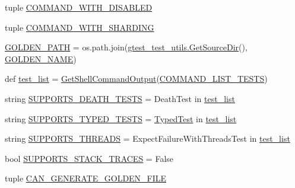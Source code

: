 \begin{DoxyCompactItemize}
tuple \hyperlink{namespacegtest__output__test_a0ef963a39dc8e53616ba2dab9f128def}{C\+O\+M\+M\+A\+N\+D\+\_\+\+W\+I\+T\+H\+\_\+\+D\+I\+S\+A\+B\+L\+ED}
\item 
tuple \hyperlink{namespacegtest__output__test_a462eef2a00782001d491b7a38a847bec}{C\+O\+M\+M\+A\+N\+D\+\_\+\+W\+I\+T\+H\+\_\+\+S\+H\+A\+R\+D\+I\+NG}
\item 
\hyperlink{namespacegtest__output__test_aa592d897eeba0ac7e1a3c7d84f182c11}{G\+O\+L\+D\+E\+N\+\_\+\+P\+A\+TH} = os.\+path.\+join(\hyperlink{namespacegtest__test__utils_aaff66cb0980804d8bd57dc719d4b5518}{gtest\+\_\+test\+\_\+utils.\+Get\+Source\+Dir}(), \hyperlink{namespacegtest__output__test_a317ece7d11d9103a7bdbf0320b64a981}{G\+O\+L\+D\+E\+N\+\_\+\+N\+A\+ME})
\item 
def \hyperlink{namespacegtest__output__test_a1e17eb07fcc42eefeed11a5f87b2d3ae}{test\+\_\+list} = \hyperlink{namespacegtest__output__test_a0dbdd37611259249a58ab13ed60d8172}{Get\+Shell\+Command\+Output}(\hyperlink{namespacegtest__output__test_ad57de209fb07e1002c8a929dd8a15dc9}{C\+O\+M\+M\+A\+N\+D\+\_\+\+L\+I\+S\+T\+\_\+\+T\+E\+S\+TS})
\item 
string \hyperlink{namespacegtest__output__test_a401e837dae10d6c728bd74684884a77f}{S\+U\+P\+P\+O\+R\+T\+S\+\_\+\+D\+E\+A\+T\+H\+\_\+\+T\+E\+S\+TS} = \textquotesingle{}Death\+Test\textquotesingle{} in \hyperlink{namespacegtest__output__test_a1e17eb07fcc42eefeed11a5f87b2d3ae}{test\+\_\+list}
\item 
string \hyperlink{namespacegtest__output__test_aa762abdf62ac6efe1aa2405b3f506380}{S\+U\+P\+P\+O\+R\+T\+S\+\_\+\+T\+Y\+P\+E\+D\+\_\+\+T\+E\+S\+TS} = \textquotesingle{}\hyperlink{class_typed_test}{Typed\+Test}\textquotesingle{} in \hyperlink{namespacegtest__output__test_a1e17eb07fcc42eefeed11a5f87b2d3ae}{test\+\_\+list}
\item 
string \hyperlink{namespacegtest__output__test_a9c611ee196914defbb5d32a47c606640}{S\+U\+P\+P\+O\+R\+T\+S\+\_\+\+T\+H\+R\+E\+A\+DS} = \textquotesingle{}Expect\+Failure\+With\+Threads\+Test\textquotesingle{} in \hyperlink{namespacegtest__output__test_a1e17eb07fcc42eefeed11a5f87b2d3ae}{test\+\_\+list}
\item 
bool \hyperlink{namespacegtest__output__test_a1e8e722c50268029e33d6fde753cff54}{S\+U\+P\+P\+O\+R\+T\+S\+\_\+\+S\+T\+A\+C\+K\+\_\+\+T\+R\+A\+C\+ES} = False
\item 
tuple \hyperlink{namespacegtest__output__test_aa370a0da630f54a564d79507df196854}{C\+A\+N\+\_\+\+G\+E\+N\+E\+R\+A\+T\+E\+\_\+\+G\+O\+L\+D\+E\+N\+\_\+\+F\+I\+LE}
\item 

\end{DoxyCompactItemize}
